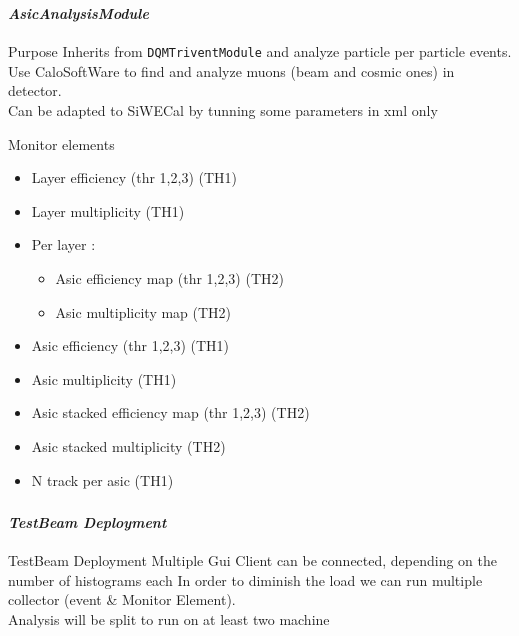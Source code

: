 \documentclass[8pt]{beamer}
\begin{document}
  \begin{frame}[containsverbatim]
    \frametitle{\secname}
    \framesubtitle{\textit{AsicAnalysisModule}}
    \begin{block}{Purpose}
      Inherits from \verb|DQMTriventModule| and analyze particle per particle events. \\
      Use CaloSoftWare to find and analyze muons (beam and cosmic ones) in detector. \\
      Can be adapted to SiWECal by tunning some parameters in xml only
    \end{block}

    \begin{block}{Monitor elements}
      \begin{itemize}
        \item Layer efficiency (thr 1,2,3) (TH1)
        \item Layer multiplicity (TH1)
        \item Per layer :
        \begin{itemize}
          \item Asic efficiency map (thr 1,2,3) (TH2)
          \item Asic multiplicity map (TH2)
        \end{itemize}
        \item Asic efficiency (thr 1,2,3) (TH1)
        \item Asic multiplicity (TH1)
        \item Asic stacked efficiency map (thr 1,2,3) (TH2)
        \item Asic stacked multiplicity (TH2)
        \item N track per asic (TH1)
      \end{itemize}
    \end{block}
  \end{frame}


  \begin{frame}
  \frametitle{\secname}
  \framesubtitle{\textit{TestBeam Deployment}}

  \begin{block}{TestBeam Deployment}
    Multiple Gui Client can be connected, depending on the number of histograms each In order to diminish the load we can run multiple collector (event \& Monitor Element).\\
    Analysis will be split to run on at least two machine

  \end{block}
  \end{frame}
\end{document}
